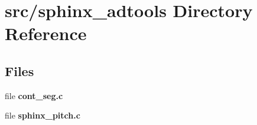 \section{src/sphinx\-\_\-adtools Directory Reference}
\label{dir_626a4c20570d8d1011e4cc5b6ee6b8c0}
\subsection*{Files}
\begin{DoxyCompactItemize}
\item 
file {\bfseries cont\-\_\-seg.\-c}
\item 
file {\bfseries sphinx\-\_\-pitch.\-c}
\end{DoxyCompactItemize}
